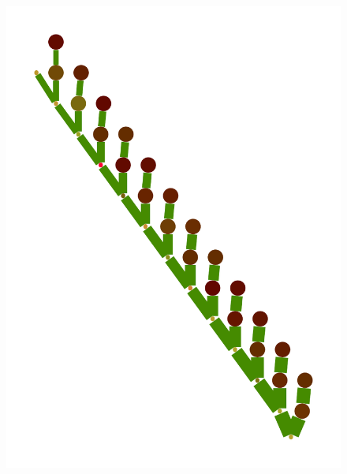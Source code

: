 \documentclass[a4paper,10pt]{article}
\begin{document}
\begin{figure}
{    \includegraphics[scale=.14]{../figures/vector/6-4-vine-induced-4.pdf}
}
\end{figure}
\end{document}
